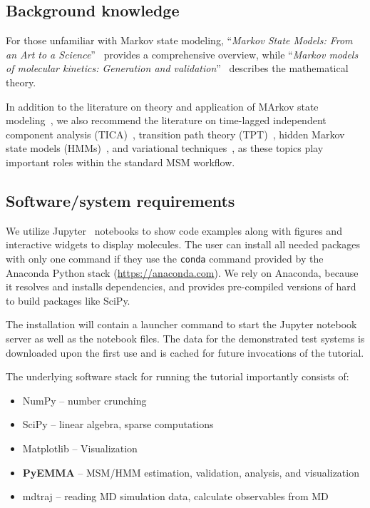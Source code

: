 \documentclass[9pt,tutorial]{livecoms}
\begin{document}
\subsection{Background knowledge}
\label{sec:background}

For those unfamiliar with Markov state modeling, ``\emph{Markov State Models: From an Art to a Science}''~\cite{msm-brooke} provides a comprehensive overview, while ``\emph{Markov models of molecular kinetics: Generation and validation}''~\cite{msm-jhp} describes the mathematical theory. 

In addition to the literature on theory and application of MArkov state modeling~\cite{msm-book,buchete-msm-2008,noe-tmat-sampling,bowman-msm-2009,noe-folding-pathways,sarich-msm-quality,noe-fingerprints,noe-dy-neut-scatt,Chodera2014,ben-rev-msm,simon-mech-mod-nmr,oom-feliks}, we also recommend the literature on time-lagged independent component analysis (TICA)~\cite{tica,tica3,tica2,kinetic-maps}, transition path theory (TPT)~\cite{weinan-tpt,metzner-msm-tpt}, hidden Markov state models (HMMs)~\cite{noe-proj-hid-msm,hmm-baum-welch-alg,hmm-tutorial}, and variational techniques~\cite{noe-vac,vamp-preprint,gmrq}, as these topics play important roles within the standard MSM workflow.

\subsection{Software/system requirements}

We utilize Jupyter~\cite{jupyter} notebooks to show code examples along with figures and interactive widgets to display molecules. The user can install all needed packages with only one command if they use the \texttt{conda} command provided by the Anaconda Python stack (\url{https://anaconda.com}). We rely on Anaconda, because it resolves and installs dependencies, and provides pre-compiled versions of hard to build packages like SciPy.

The installation will contain a launcher command to start the Jupyter notebook server as well as the notebook files. The data for the demonstrated test systems is downloaded upon the first use and is cached for future invocations of the tutorial.

The underlying software stack for running the tutorial importantly consists of:
\begin{itemize}
\item NumPy -- number crunching~\cite{numpy}
\item SciPy -- linear algebra, sparse computations~\cite{scipy}
\item Matplotlib -- Visualization~\cite{matplotlib}
\item \textbf{PyEMMA} -- MSM/HMM estimation, validation, analysis, and visualization~\cite{pyemma}
\item mdtraj -- reading MD simulation data, calculate observables from MD~\cite{mdtraj}
\end{itemize}
\end{document}
